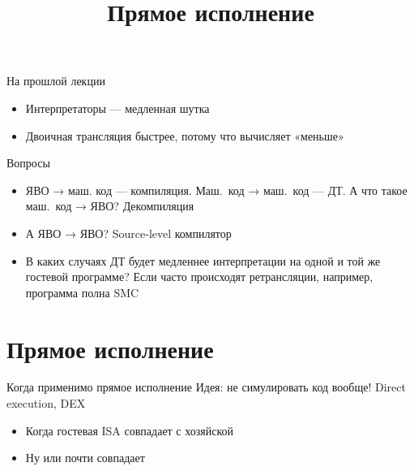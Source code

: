 
\title{Прямое исполнение}



\begin{frame}
    \maketitle
\end{frame}

\begin{frame}
    \tableofcontents
\end{frame}


\begin{frame}{На прошлой лекции}
\begin{itemize}
\item Интерпретаторы — медленная шутка
\item Двоичная трансляция быстрее, потому что вычисляет «меньше»
\end{itemize}
\end{frame}

\begin{frame}{Вопросы}
\begin{itemize}
\item ЯВО → маш. код — компиляция. Маш.~код → маш.~код — ДТ. А что такое маш.~код → ЯВО?\pause{} Декомпиляция\pause
\item А ЯВО → ЯВО?\pause{} Source-level компилятор\pause
\item В каких случаях ДТ будет медленнее интерпретации на одной и той же гостевой программе? \pause Если часто происходят ретрансляции, например, программа полна SMC
\end{itemize}

\end{frame}


\section{Прямое исполнение}

\begin{frame}{Когда применимо прямое исполнение}
Идея: не симулировать код вообще! Direct execution, DEX
\begin{itemize}
\item Когда гостевая ISA совпадает с хозяйской
\item Ну или почти совпадает
\end{itemize}

\end{frame}

